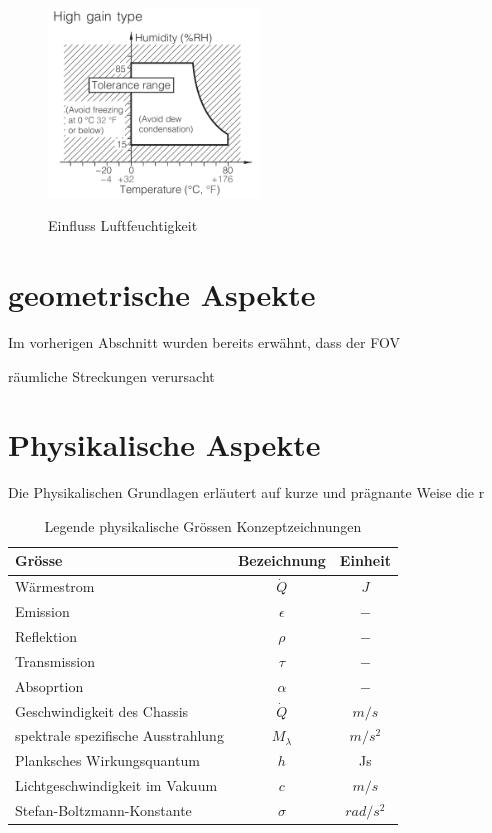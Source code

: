 \begin{figure}[H]
	\centering
	\includegraphics[width=0.5\textwidth]
	{fig/Humidity_Tolerance.PNG}
	\caption[Einfluss Luftfeuchtigkeit]{Einfluss Luftfeuchtigkeit} \protect\cite{AMG8834}
	\label{fig:Humidity}
\end{figure}


\section{geometrische Aspekte}

Im vorherigen Abschnitt wurden bereits erwähnt, dass der \ac{FOV}


räumliche Streckungen verursacht

\section{Physikalische Aspekte}

Die Physikalischen Grundlagen erläutert auf kurze und prägnante Weise die r

\begin{table}[H]
	\begin{tabular}{l|c|c}
		
		\rowcolor{gray} Grösse &  Bezeichnung  & Einheit \\
		\hline 
		Wärmestrom &  $\dot{Q}$ & $J$  \\ 
		\rowcolor{gray}Emission & $\epsilon$ & $-$\\	
		Reflektion &  $\rho $ & $-$ \\
		\rowcolor{gray} Transmission & $\tau$ & $-$\\
		Absoprtion &  $\alpha$ & $-$  \\ 
		
		\rowcolor{gray}Geschwindigkeit des Chassis & $\dot{Q}$ & $m/s$\\
		spektrale spezifische Ausstrahlung &  $M_{\lambda }$ & $m/s^2$ \\
		\rowcolor{gray} Planksches Wirkungsquantum &  $ h$ & Js \\ 
		Lichtgeschwindigkeit im Vakuum & $c $ & $ m/s$ \\ 
		\rowcolor{gray} Stefan-Boltzmann-Konstante & $\sigma$ & $ rad/s^2 $ \\ 
	\end{tabular}
	\caption{Legende physikalische Grössen Konzeptzeichnungen}
	\label{tab:Legende Physikalische Grössen} 
\end{table} 


